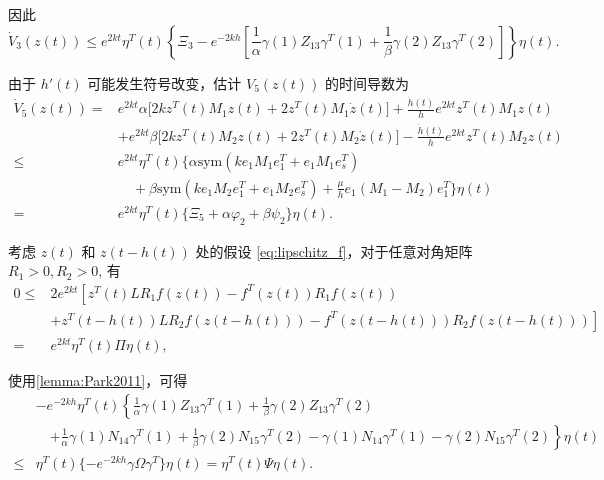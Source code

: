 \documentclass[a4paper, 12pt, oneside]{article}
\theoremstyle{cn_theorem}
\begin{document}
因此
\begin{equation*}
    \dot{V}_3(z(t)) \le e^{2kt} \eta^T(t) \left\{ \Xi_3 - e^{-2kh} \left[ \frac{1}{\alpha}\gamma(1) Z_{13} \gamma^T(1) + \frac{1}{\beta}\gamma(2) Z_{13} \gamma^T(2) \right] \right\} \eta(t).
\end{equation*}

由于 $h'(t)$ 可能发生符号改变，估计 $V_5(z(t))$ 的时间导数为
\begin{align*}
    \dot{V}_5(z(t)) =& e^{2kt} \alpha \Big[ 2k z^T(t) M_1 z(t) + 2 z^T(t) M_1 \dot{z}(t) \Big] + \frac{\dot{h}(t)}{h} e^{2kt} z^T(t) M_1 z(t) \\
                     & + e^{2kt} \beta \Big[ 2k z^T(t) M_2 z(t) + 2 z^T(t) M_2 \dot{z}(t) \Big] - \frac{\dot{h}(t)}{h} e^{2kt} z^T(t) M_2 z(t) \\
    \le & e^{2kt} \eta^T(t) \Big\{ \alpha \mathrm{sym}(k e_1 M_1 e_1^T + e_1 M_1 e_s^T) \nonumber \\
        & \quad + \beta \mathrm{sym}(k e_1 M_2 e_1^T + e_1 M_2 e_s^T) + \frac{\mu}{h} e_1(M_1 - M_2) e_1^T \Big\} \eta(t) \\
    =& e^{2kt} \eta^T(t) \{ \Xi_5 + \alpha \varphi_2 + \beta \psi_2 \} \eta(t).
\end{align*}

考虑 $z(t)$ 和 $z(t-h(t))$ 处的假设 \eqref{eq:lipschitz_f}，对于任意对角矩阵 $R_1 > 0, R_2 > 0$, 有
\begin{equation} \label{eq:bound_31}
\begin{split}
    0 \le & 2 e^{2kt} \left[ z^T(t) L R_1 f(z(t)) - f^T(z(t)) R_1 f(z(t)) \right. \\
          & \left. + z^T(t-h(t)) L R_2 f(z(t-h(t))) - f^T(z(t-h(t))) R_2 f(z(t-h(t))) \right] \\
    = & e^{2kt} \eta^T(t) \Pi \eta(t),
\end{split}
\end{equation}

使用\cref{lemma:Park2011}，可得
\begin{align*}
    & -e^{-2kh} \eta^T(t) \left\{ \frac{1}{\alpha}\gamma(1) Z_{13} \gamma^T(1) + \frac{1}{\beta}\gamma(2) Z_{13} \gamma^T(2) \right. \\
    & \quad \left. + \frac{1}{\alpha}\gamma(1) N_{14} \gamma^T(1) + \frac{1}{\beta}\gamma(2) N_{15} \gamma^T(2) - \gamma(1) N_{14} \gamma^T(1) - \gamma(2) N_{15} \gamma^T(2) \right\} \eta(t) \\
    \le & \eta^T(t) \{ -e^{-2kh} \gamma \Omega \gamma^T \} \eta(t) = \eta^T(t) \Psi \eta(t).
\end{align*}
\end{document}
